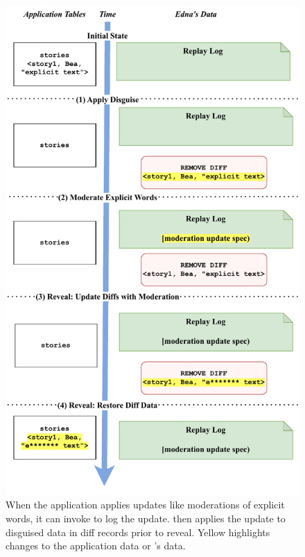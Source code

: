 \begin{figure}
    \centering
    \includegraphics[width=.8\textwidth]{figs/update-moderation}
    \caption{When the application applies updates like moderations of explicit
    words, it can invoke \sys to log the update. \sys then applies the
    update to disguised data in diff records prior to reveal. Yellow 
    highlights changes to the application data or \sys's data.}
\label{f:update:mod}
\end{figure}


